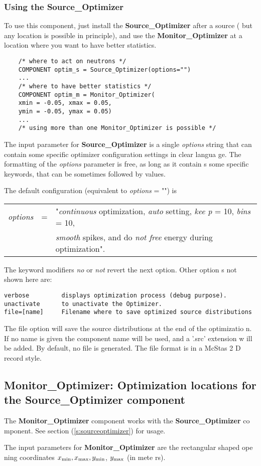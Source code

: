 \documentclass[12pt]{report}
\begin{document}
\subsubsection{Using the Source\_Optimizer}

To use this component, just install the {\bf Source\_Optimizer} after a source (
but any location is possible in principle), and use the {\bf Monitor\_Optimizer}
 at a location where you want to have better statistics.

\begin{verbatim}
    /* where to act on neutrons */
    COMPONENT optim_s = Source_Optimizer(options="") 
    ...
    /* where to have better statistics */
    COMPONENT optim_m = Monitor_Optimizer( 
    xmin = -0.05, xmax = 0.05, 
    ymin = -0.05, ymax = 0.05) 
    ...
    /* using more than one Monitor_Optimizer is possible */
\end{verbatim}

The input parameter for {\bf Source\_Optimizer} is a single {\it options} string
 that can contain some specific optimizer configuration settings in clear langua
ge. The formatting of the {\it options} parameter is free, as long as it contain
s some specific keywords, that can be sometimes followed by values.

The default configuration (equivalent to {\it options} = "") is
\begin{center}
\begin{tabular}{rcl}
{\it options} & = & "{\it continuous} optimization, {\it auto} setting, {\it kee
p} = 10, {\it bins} = 10, \\
& & {\it smooth} spikes, and do {\it not free} energy during optimization".
\end{tabular}
\end{center}
The keyword modifiers {\it no} or {\it not} revert the next option. Other option
s not shown here are:
\begin{verbatim}
verbose         displays optimization process (debug purpose).
unactivate      to unactivate the Optimizer.
file=[name]     Filename where to save optimized source distributions
\end{verbatim}
The file option will save the source distributions at the end of the optimizatio
n. If no name is given the component name will be used, and a '.src' extension w
ill be added. By default, no file is generated. The file format is in a McStas 2
D record style.

\subsection{Monitor\_Optimizer: Optimization locations for the Source\_Optimizer
 component}
\label{s:monitoroptimizer}

The {\bf Monitor\_Optimizer} component works with the {\bf Source\_Optimizer} co
mponent. See section (\ref{s:sourceoptimizer}) for usage.

The input parameters for {\bf Monitor\_Optimizer} are the rectangular shaped ope
ning coordinates $x_{\rm min}, x_{\rm max}, y_{\rm min}$, $y_{\rm max}$ (in mete
rs).
\end{document}
